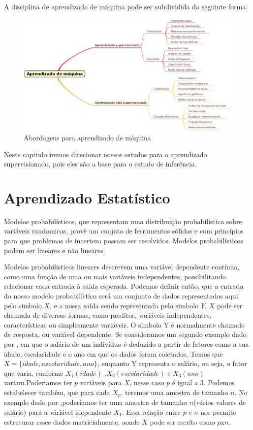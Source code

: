 A disciplina de aprendizado de máquina pode ser subdividida da seguinte forma:
\begin{figure}[h]
	\centering
	\label{fig01}
        \includegraphics[scale=0.48]{figuras/mind1.eps}
	\caption{Abordagens para aprendizado de máquina}
\end{figure}
Neste capitulo iremos direcionar nossos estudos para o aprendizado supervisionado, pois eles são a base para o estudo de inferência.

\section{Aprendizado Estatístico}

Modelos probabilísticos, que representam uma distribuição probabilistica sobre variáveis randomicas, provê um conjuto de ferramentas sólidas e com princípios para
que problemas de incerteza possam ser resolvidos\cite{Sun}. Modelos probabilísticos podem ser lineares e não lineares. 

Modelos probabilisticos lineares descrevem uma variável dependente contínua, como uma função de uma ou mais variáveis independentes, possibilitando relacionar cada entrada à saída
esperada. Podemos definir então, que a entrada do nosso modelo probabilístico será um conjunto de dados representados aqui pelo simbolo $X$, e a nossa saída sendo representada pelo simbolo $Y$.  $X$ pode ser chamada de diversas formas, como preditor, variáveis independentes, características ou simplesmente variáveis.
O simbolo Y é normalmente chamado de resposta, ou variável dependente. Se consideramos um segundo exemplo dado por \cite{James}, em que o salário de um indivíduo é deduzido a partir
de fatores como a sua idade, escolaridade e o ano em que os dados foram coletados. Temos que $X = \{idade, escolaridade, ano\}$, enquanto Y representa o salário, ou seja, o fator que varia,
conforme $X_1(idade)$  ,$X_2(escolaridade)$ e $X_3(ano)$ variam.Poderiamos ter $p$ variáveis para $X$, nesse caso $p$ é igual a 3.
Podemos estabelecer também, que para cada $X_p$, teremos uma amostra de tamanho $n$. No exemplo dado por \cite{James},poderíamos ter uma amostra de tamanho $n$(vários valores de salário) para a váriável idependente $X_1$. Essa relação entre $p$ e $n$ nos permite estruturar esses dados matricialmente, aonde $X$ pode ser escrito como $p$x$n$\cite{James}.

